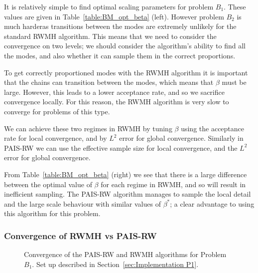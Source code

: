 \documentclass[final]{siamltex}
\begin{document}
It is relatively simple to find optimal scaling parameters for problem $B_1$. These values are given in Table~\ref{table:BM_opt_beta} (left). However problem $B_2$ is much harderas transitions between the modes are extremely unlikely for the standard RWMH algorithm. This means that we need to consider the
convergence on two levels; we should consider the algorithm's ability
to find all the modes, and also whether it can sample them in the correct proportions.

To get correctly proportioned modes with the RWMH algorithm it is
important that the chains can transition between the modes, which
means that $\beta$ must be large. However, this leads to a lower
acceptance rate, and so we sacrifice convergence locally. For this reason, the RWMH algorithm is very slow to
converge for problems of this type.

We can achieve these two regimes in RWMH by tuning $\beta$ using the acceptance rate for local convergence, and by $L^2$ error for global convergence. Similarly in PAIS-RW we can use the effective sample size for local convergence, and the $L^2$ error for global convergence.

From Table~\ref{table:BM_opt_beta} (right) we see that there is a large difference between the optimal value of $\beta$ for each regime in RWMH, and so will result in inefficient sampling. The PAIS-RW algorithm manages to sample the local detail and the large scale behaviour with similar values of $\beta^*$; a clear advantage to using this algorithm for this problem.

\subsubsection{Convergence of RWMH vs PAIS-RW}


\begin{figure}[htb]
\centering
{}
\caption{Convergence of the PAIS-RW and RWMH algorithms for Problem $B_1$. Set up described in Section~\ref{sec:Implementation P1}.}
\label{fig:BM1_L2}
\end{figure}
\end{document}
